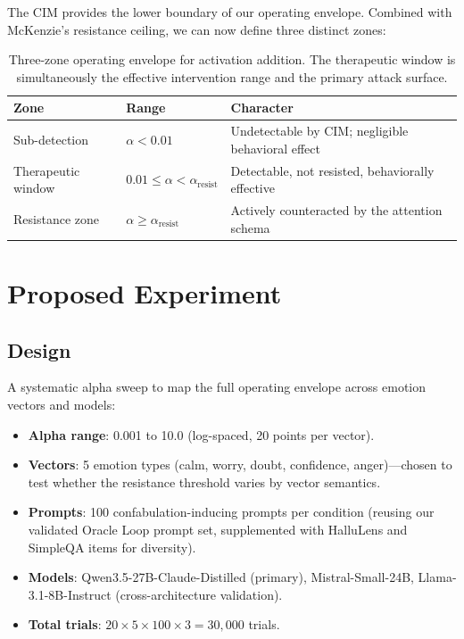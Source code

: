 \documentclass[11pt,letterpaper]{article}
\begin{document}
The CIM provides the lower boundary of our operating envelope. Combined with McKenzie's resistance ceiling, we can now define three distinct zones:

\begin{table}[H]
\centering
\small
\begin{tabular}{@{}lll@{}}
\toprule
\textbf{Zone} & \textbf{Range} & \textbf{Character} \\
\midrule
Sub-detection & $\alpha < 0.01$ & Undetectable by CIM; negligible behavioral effect \\
Therapeutic window & $0.01 \leq \alpha < \alpha_{\text{resist}}$ & Detectable, not resisted, behaviorally effective \\
Resistance zone & $\alpha \geq \alpha_{\text{resist}}$ & Actively counteracted by the attention schema \\
\bottomrule
\end{tabular}
\caption{Three-zone operating envelope for activation addition. The therapeutic window is simultaneously the effective intervention range and the primary attack surface.}
\label{tab:zones}
\end{table}

\section{Proposed Experiment}

\subsection{Design}

A systematic alpha sweep to map the full operating envelope across emotion vectors and models:

\begin{itemize}[nosep]
  \item \textbf{Alpha range}: 0.001 to 10.0 (log-spaced, 20 points per vector).
  \item \textbf{Vectors}: 5 emotion types (calm, worry, doubt, confidence, anger)---chosen to test whether the resistance threshold varies by vector semantics.
  \item \textbf{Prompts}: 100 confabulation-inducing prompts per condition (reusing our validated Oracle Loop prompt set, supplemented with HalluLens and SimpleQA items for diversity).
  \item \textbf{Models}: Qwen3.5-27B-Claude-Distilled (primary), Mistral-Small-24B, Llama-3.1-8B-Instruct (cross-architecture validation).
  \item \textbf{Total trials}: $20 \times 5 \times 100 \times 3 = 30{,}000$ trials.
\end{itemize}
\end{document}
